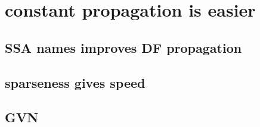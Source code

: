 \chapter*{constant propagation is easier}



\section{SSA names improves DF propagation}
\section{sparseness gives speed}
\section{GVN}
